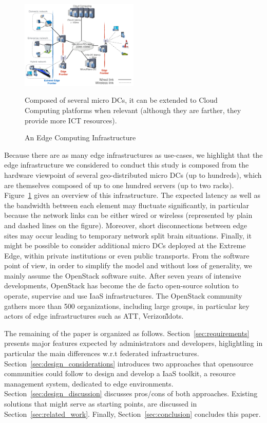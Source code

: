 \begin{figure}[]
  \centering
  \includegraphics[width=0.5\textwidth]{./figures/figure_fog.pdf}
  \caption{An Edge Computing Infrastructure~\cite{7923796}}
  \label{fig:fogedge-archi}
  {\small{Composed of several micro DCs, it can be extended to Cloud Computing platforms when relevant (although they are farther, they provide more ICT resources).}}
\end{figure}

Because there are as many edge infrastructures as use-cases, we
highlight that the edge infrastructure we considered to conduct this
study is composed from the hardware viewpoint of several
geo-distributed micro DCs (up to hundreds), which are themselves
composed of up to one hundred servers (up to two racks).
Figure~\ref{fig:fogedge-archi} gives an overview of this
infrastructure. The expected latency as well as the bandwidth between
each element may fluctuate significantly, in particular because the
network links can be either wired or wireless (represented by plain
and dashed lines on the figure). Moreover, short disconnections
between edge sites may occur leading to temporary network split brain
situations.  Finally, it might be possible
to consider additional micro DCs deployed at the Extreme Edge, within
private institutions or even public transports.
%
From the software point of view, in order to simplify the model and
without loss of generality, we mainly assume the OpenStack software
suite.  After seven years of intensive developments, OpenStack has
become the de facto open-source solution to operate, supervise and use
IaaS infrastructures.  The OpenStack community gathers more than 500
organizations, including large groups, in particular key actors of
edge infrastructures such as ATT, Verizon\~ldots.


The remaining of the paper is organized as
follows. Section~\ref{sec:requirements} presents major features
expected by administrators and developers, higlightling in particular
the main differences w.r.t federated infrastructures.
Section~\ref{sec:design_considerations} introduces two approaches that
opensource communities could follow to design and develop a IaaS
toolkit, \aka a resource management system, dedicated to edge
environments. Section~\ref{sec:design_discussion} discusses pros/cons
of both approaches. Existing solutions that might serve as starting
points, are discussed in Section~\ref{sec:related_work}. Finally,
Section~\ref{sec:conclusion} concludes this paper.



